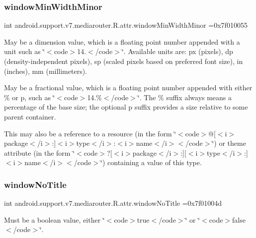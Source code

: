 \subsubsection{\texorpdfstring{window\+Min\+Width\+Minor}{windowMinWidthMinor}}
{\footnotesize\ttfamily int android.\+support.\+v7.\+mediarouter.\+R.\+attr.\+window\+Min\+Width\+Minor =0x7f010055\hspace{0.3cm}{\ttfamily [static]}}

May be a dimension value, which is a floating point number appended with a unit such as \char`\"{}$<$code$>$14.\+5sp$<$/code$>$\char`\"{}. Available units are\+: px (pixels), dp (density-\/independent pixels), sp (scaled pixels based on preferred font size), in (inches), mm (millimeters). 

May be a fractional value, which is a floating point number appended with either \% or p, such as \char`\"{}$<$code$>$14.\%$<$/code$>$\char`\"{}. The \% suffix always means a percentage of the base size; the optional p suffix provides a size relative to some parent container. 

This may also be a reference to a resource (in the form \char`\"{}$<$code$>$@\mbox{[}$<$i$>$package$<$/i$>$\+:\mbox{]}$<$i$>$type$<$/i$>$\+:$<$i$>$name$<$/i$>$$<$/code$>$\char`\"{}) or theme attribute (in the form \char`\"{}$<$code$>$?\mbox{[}$<$i$>$package$<$/i$>$\+:\mbox{]}\mbox{[}$<$i$>$type$<$/i$>$\+:\mbox{]}$<$i$>$name$<$/i$>$$<$/code$>$\char`\"{}) containing a value of this type. \mbox{\label{classandroid_1_1support_1_1v7_1_1mediarouter_1_1R_1_1attr_a66963fa72a2f109826b4838d68850ae1}} 
\subsubsection{\texorpdfstring{window\+No\+Title}{windowNoTitle}}
{\footnotesize\ttfamily int android.\+support.\+v7.\+mediarouter.\+R.\+attr.\+window\+No\+Title =0x7f01004d\hspace{0.3cm}{\ttfamily [static]}}

Must be a boolean value, either \char`\"{}$<$code$>$true$<$/code$>$\char`\"{} or \char`\"{}$<$code$>$false$<$/code$>$\char`\"{}. 

